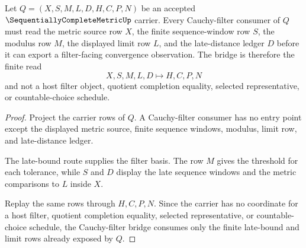 \begin{theorem}
\label{thm:sequentially-complete-metric-cauchy-filter-bridge}
Let $Q=(X,S,M,L,D,H,C,P,N)$ be an accepted $\SequentiallyCompleteMetricUp$ carrier. Every Cauchy-filter consumer of $Q$ must read the metric source row $X$, the finite sequence-window row $S$, the modulus row $M$, the displayed limit row $L$, and the late-distance ledger $D$ before it can export a filter-facing convergence observation. The bridge is therefore the finite read
$$
X,S,M,L,D \longmapsto H,C,P,N
$$
and not a host filter object, quotient completion equality, selected representative, or countable-choice schedule.
\end{theorem}
\begin{proof}
Project the carrier rows of $Q$. A Cauchy-filter consumer has no entry point except the displayed metric source, finite sequence windows, modulus, limit row, and late-distance ledger.

The late-bound route supplies the filter basis. The row $M$ gives the threshold for each tolerance, while $S$ and $D$ display the late sequence windows and the metric comparisons to $L$ inside $X$.

Replay the same rows through $H,C,P,N$. Since the carrier has no coordinate for a host filter, quotient completion equality, selected representative, or countable-choice schedule, the Cauchy-filter bridge consumes only the finite late-bound and limit rows already exposed by $Q$.
\end{proof}

